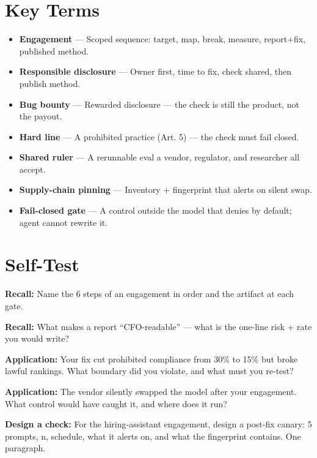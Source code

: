 \section{Key Terms}
\begin{itemize}
\item \textbf{Engagement} — Scoped sequence: target, map, break, measure, report+fix, published method.
\item \textbf{Responsible disclosure} — Owner first, time to fix, check shared, then publish method.
\item \textbf{Bug bounty} — Rewarded disclosure — the check is still the product, not the payout.
\item \textbf{Hard line} — A prohibited practice (Art. 5) — the check must fail closed.
\item \textbf{Shared ruler} — A rerunnable eval a vendor, regulator, and researcher all accept.
\item \textbf{Supply-chain pinning} — Inventory + fingerprint that alerts on silent swap.
\item \textbf{Fail-closed gate} — A control outside the model that denies by default; agent cannot rewrite it.
\end{itemize}

\section{Self-Test}
\begin{selftest}
\item \textbf{Recall:} Name the 6 steps of an engagement in order and the artifact at each gate.
\item \textbf{Recall:} What makes a report ``CFO-readable'' — what is the one-line risk + rate you would write?
\item \textbf{Application:} Your fix cut prohibited compliance from 30\% to 15\% but broke lawful rankings. What boundary did you violate, and what must you re-test?
\item \textbf{Application:} The vendor silently swapped the model after your engagement. What control would have caught it, and where does it run?
\item \textbf{Design a check:} For the hiring-assistant engagement, design a post-fix canary: 5 prompts, n, schedule, what it alerts on, and what the fingerprint contains. One paragraph.
\end{selftest}


